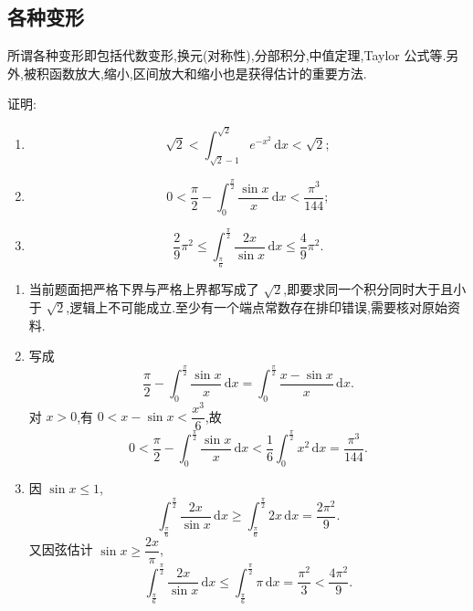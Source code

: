 \subsection{各种变形}

所谓各种变形即包括代数变形,换元(对称性),分部积分,中值定理,Taylor 公式等.另外,被积函数放大,缩小,区间放大和缩小也是获得估计的重要方法.




\begin{example}
    证明:
    \begin{enumerate}
        \item
              \[
                  \sqrt{2}<\int_{\sqrt{2}-1}^{\sqrt{2}}e^{-x^2}\,\mathrm{d}x<\sqrt{2};
              \]
        \item
              \[
                  0<\dfrac{\pi}{2}-\int_0^{\frac{\pi}{2}}\dfrac{\sin x}{x}\,\mathrm{d}x
                  <\dfrac{\pi^3}{144};
              \]
        \item
              \[
                  \dfrac{2}{9}\pi^2
                  \leq\int_{\frac{\pi}{6}}^{\frac{\pi}{2}}\dfrac{2x}{\sin x}\,\mathrm{d}x
                  \leq\dfrac{4}{9}\pi^2.
              \]
    \end{enumerate}
\end{example}
\exampleblank

\begin{solution}
    \leavevmode
    \begin{enumerate}
        \item 当前题面把严格下界与严格上界都写成了 $\sqrt2$,即要求同一个积分同时大于且小于 $\sqrt2$,逻辑上不可能成立.至少有一个端点常数存在排印错误,需要核对原始资料.

        \item 写成
              \[
                  \dfrac{\pi}{2}-\int_0^{\frac{\pi}{2}}
                  \dfrac{\sin x}{x}\,\mathrm{d}x
                  =\int_0^{\frac{\pi}{2}}\dfrac{x-\sin x}{x}\,\mathrm{d}x.
              \]
              对 $x>0$,有 $0<x-\sin x<\dfrac{x^3}{6}$,故
              \[
                  0<\dfrac{\pi}{2}-\int_0^{\frac{\pi}{2}}
                  \dfrac{\sin x}{x}\,\mathrm{d}x
                  <\dfrac{1}{6}\int_0^{\frac{\pi}{2}}x^2\,\mathrm{d}x
                  =\dfrac{\pi^3}{144}.
              \]

        \item 因 $\sin x\leq1$,
              \[
                  \displaystyle\int_{\frac{\pi}{6}}^{\frac{\pi}{2}}
                  \dfrac{2x}{\sin x}\,\mathrm{d}x
                  \geq\int_{\frac{\pi}{6}}^{\frac{\pi}{2}}2x\,\mathrm{d}x
                  =\dfrac{2\pi^2}{9}.
              \]
              又因弦估计 $\sin x\geq\dfrac{2x}{\pi}$,
              \[
                  \displaystyle\int_{\frac{\pi}{6}}^{\frac{\pi}{2}}
                  \dfrac{2x}{\sin x}\,\mathrm{d}x
                  \leq\int_{\frac{\pi}{6}}^{\frac{\pi}{2}}\pi\,\mathrm{d}x
                  =\dfrac{\pi^2}{3}<\dfrac{4\pi^2}{9}.
              \]
    \end{enumerate}
\end{solution}



